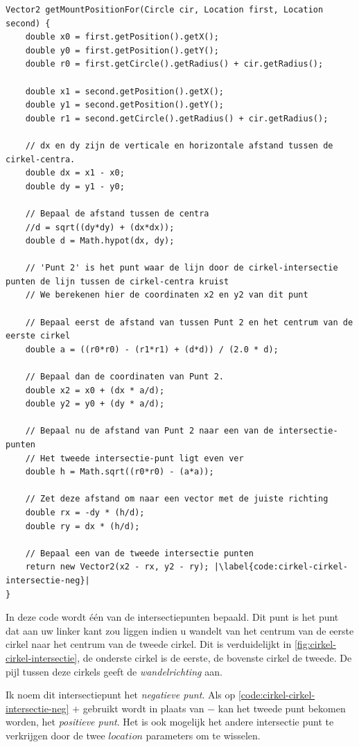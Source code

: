 \documentclass[12pt,a4paper,oneside]{book}
\begin{document}
\begin{lstlisting}
Vector2 getMountPositionFor(Circle cir, Location first, Location second) {
	double x0 = first.getPosition().getX();
	double y0 = first.getPosition().getY();
	double r0 = first.getCircle().getRadius() + cir.getRadius();

	double x1 = second.getPosition().getX();
	double y1 = second.getPosition().getY();
	double r1 = second.getCircle().getRadius() + cir.getRadius();

	// dx en dy zijn de verticale en horizontale afstand tussen de cirkel-centra.
	double dx = x1 - x0;
	double dy = y1 - y0;

	// Bepaal de afstand tussen de centra
	//d = sqrt((dy*dy) + (dx*dx));
	double d = Math.hypot(dx, dy);

	// 'Punt 2' is het punt waar de lijn door de cirkel-intersectie punten de lijn tussen de cirkel-centra kruist
	// We berekenen hier de coordinaten x2 en y2 van dit punt

	// Bepaal eerst de afstand van tussen Punt 2 en het centrum van de eerste cirkel
	double a = ((r0*r0) - (r1*r1) + (d*d)) / (2.0 * d);

	// Bepaal dan de coordinaten van Punt 2.
	double x2 = x0 + (dx * a/d);
	double y2 = y0 + (dy * a/d);

	// Bepaal nu de afstand van Punt 2 naar een van de intersectie-punten
	// Het tweede intersectie-punt ligt even ver
	double h = Math.sqrt((r0*r0) - (a*a));

	// Zet deze afstand om naar een vector met de juiste richting
	double rx = -dy * (h/d);
	double ry = dx * (h/d);

	// Bepaal een van de tweede intersectie punten
	return new Vector2(x2 - rx, y2 - ry); |\label{code:cirkel-cirkel-intersectie-neg}|
}
\end{lstlisting}

In deze code wordt één van de intersectiepunten bepaald.
Dit punt is het punt dat aan uw linker kant zou liggen indien u wandelt van het centrum van de eerste cirkel naar het centrum van de tweede cirkel.
Dit is verduidelijkt in \autoref{fig:cirkel-cirkel-intersectie}, de onderste cirkel is de eerste, de bovenste cirkel de tweede.
De pijl tussen deze cirkels geeft de \textit{wandelrichting} aan.

Ik noem dit intersectiepunt het \textit{negatieve punt}.
Als op \autoref{code:cirkel-cirkel-intersectie-neg} $+$ gebruikt wordt in plaats van $-$ kan het tweede punt bekomen worden, het \textit{positieve punt}.
Het is ook mogelijk het andere intersectie punt te verkrijgen door de twee $location$ parameters om te wisselen.
\end{document}
